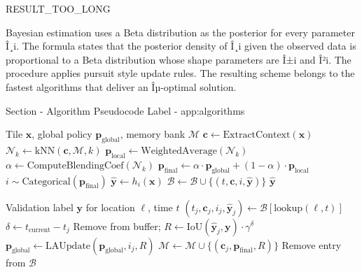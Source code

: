 \documentclass[11pt,a4paper]{article}
\begin{document}
\begin{itemize}
RESULT_TOO_LONG

Bayesian estimation uses a Beta distribution as the posterior for every parameter Î¸i. The formula states that the posterior density of Î¸i given the observed data is proportional to a Beta distribution whose shape parameters are Î±i and Î²i. The procedure applies pursuit style update rules. The resulting scheme belongs to the fastest algorithms that deliver an Îµ-optimal solution.


Section - Algorithm Pseudocode
Label - app:algorithms

\begin{algorithm}[H]
\caption{Framework Inference}
\begin{algorithmic}[1]
\Require Tile $\mathbf{x}$, global policy $\mathbf{p}_{\text{global}}$, memory bank $\mathcal{M}$
\State $\mathbf{c} \gets \text{ExtractContext}(\mathbf{x})$
\State $\mathcal{N}_k \gets \text{kNN}(\mathbf{c}, \mathcal{M}, k)$
\State $\mathbf{p}_{\text{local}} \gets \text{WeightedAverage}(\mathcal{N}_k)$
\State $\alpha \gets \text{ComputeBlendingCoef}(\mathcal{N}_k)$
\State $\mathbf{p}_{\text{final}} \gets \alpha \cdot \mathbf{p}_{\text{global}} + (1-\alpha) \cdot \mathbf{p}_{\text{local}}$
\State $i \sim \text{Categorical}(\mathbf{p}_{\text{final}})$
\State $\hat{\mathbf{y}} \gets h_i(\mathbf{x})$
\State $\mathcal{B} \gets \mathcal{B} \cup \{(t, \mathbf{c}, i, \hat{\mathbf{y}})\}$ 
\State \Return $\hat{\mathbf{y}}$
\end{algorithmic}
\end{algorithm}

\begin{algorithm}[H]
\caption{Label Arrival Processing}
\begin{algorithmic}[1]
\Require Validation label $\mathbf{y}$ for location $\ell$, time $t$
\State $(t_j, \mathbf{c}_j, i_j, \hat{\mathbf{y}}_j) \gets \mathcal{B}[\text{lookup}(\ell, t)]$
\State $\delta \gets t_{\text{current}} - t_j$ 
    \State Remove from buffer; \Return {}
\EndIf
\State $R \gets \text{IoU}(\hat{\mathbf{y}}_j, \mathbf{y}) \cdot \gamma^\delta$ 
\State $\mathbf{p}_{\text{global}} \gets \text{LAUpdate}(\mathbf{p}_{\text{global}}, i_j, R)$ 
\State $\mathcal{M} \gets \mathcal{M} \cup \{(\mathbf{c}_j, \mathbf{p}_{\text{final}}, R)\}$ 
\State Remove entry from $\mathcal{B}$
\end{algorithmic}
\end{algorithm}



\end{itemize}
\end{document}
